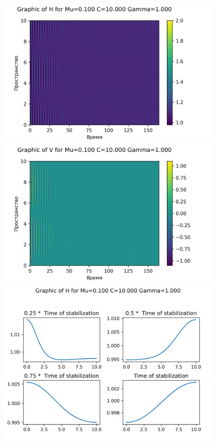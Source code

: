 \begin{figure}[H]
	\centering
	\includegraphics[scale=0.5]{../graphs_data_nonsmooth_2/value/Graph_H_mu0.100_C10.000_gamma1.000.png}
	\includegraphics[scale=0.5]{../graphs_data_nonsmooth_2/value/Graph_V_mu0.100_C10.000_gamma1.000.png}	
	\includegraphics[scale=0.5]{../graphs_data_nonsmooth_2/slices/Graph_H_mu0.100_C10.000_gamma1.000.png}

\end{figure}
